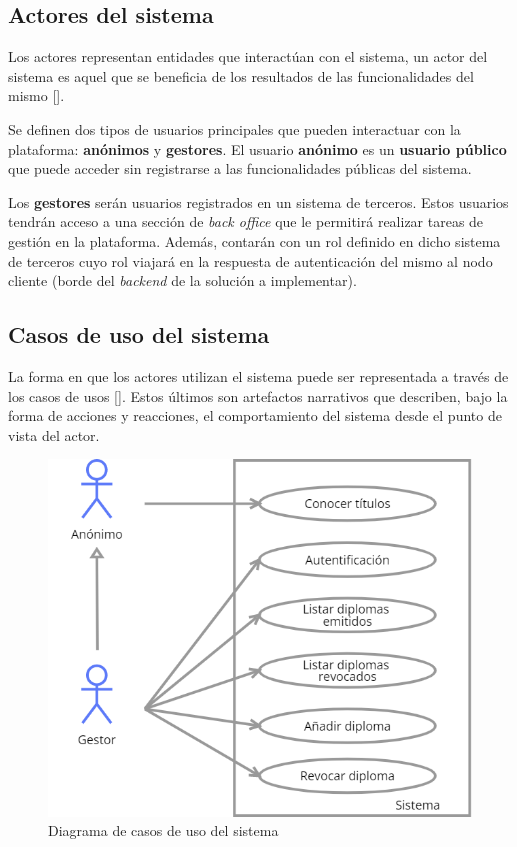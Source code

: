 \subsection{Actores del sistema}
Los actores representan entidades que interactúan con el sistema, un actor del sistema es aquel que se beneficia de los resultados de las funcionalidades del mismo [\cite{91}]. 

Se definen dos tipos de usuarios principales que pueden interactuar con la plataforma: \textbf{anónimos} y \textbf{gestores}. El usuario \textbf{anónimo} es un \textbf{usuario público} que puede acceder sin registrarse a las funcionalidades públicas del sistema.

Los \textbf{gestores} serán usuarios registrados en un sistema de terceros. Estos usuarios tendrán acceso a una sección de \textit{back office} que le permitirá realizar tareas de gestión en la plataforma. Además, contarán con un rol definido en dicho sistema de terceros cuyo rol viajará en la respuesta de autenticación del mismo al nodo cliente (borde del \textit{backend} de la solución a implementar).

\subsection{Casos de uso del sistema}
La forma en que los actores utilizan el sistema puede ser representada a través de los casos de usos [\cite{91}]. Estos últimos son artefactos narrativos que describen, bajo la forma de acciones y reacciones, el comportamiento del sistema desde el punto de vista del actor.

\begin{figure}[!h]
\centering
\includegraphics[width=\textwidth]{Graphics/useCasest}
\caption{Diagrama de casos de uso del sistema}
\label{fig:useCases}
\end{figure}

